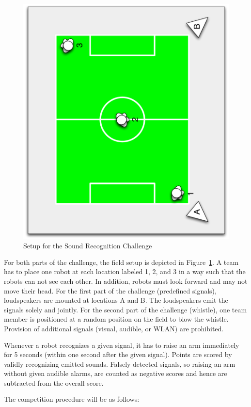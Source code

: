 \documentclass[12pt]{article}
\begin{document}
\begin{figure}[th!]
\centerline{\includegraphics[width=0.6\columnwidth,angle=270]{figures/acuesthesia}}
\caption{Setup for the Sound Recognition Challenge}
\label{fig:recognition_challenge}
\end{figure}

For both parts of the challenge, the field setup is depicted in Figure~\ref{fig:recognition_challenge}. A team has to place one robot at each location labeled 1, 2, and 3 in a way such that the robots can not see each other. In addition, robots must look forward and may not move their head. For the first part of the challenge (predefined signals), loudspeakers are mounted at locations A and B. The loudspeakers emit the signals solely and jointly. For the second part of the challenge (whistle), one team member is positioned at a random position on the field to blow the whistle. Provision of additional signals (visual, audible, or WLAN) are prohibited.

Whenever a robot recognizes a given signal, it has to raise an arm immediately for 5 seconds (within one second after the given signal).
Points are scored by validly recognizing emitted sounds. Falsely detected signals, so raising an arm without given audible alarms, are counted as negative scores and hence are subtracted from the overall score.

The competition procedure will be as follows:
\end{document}
